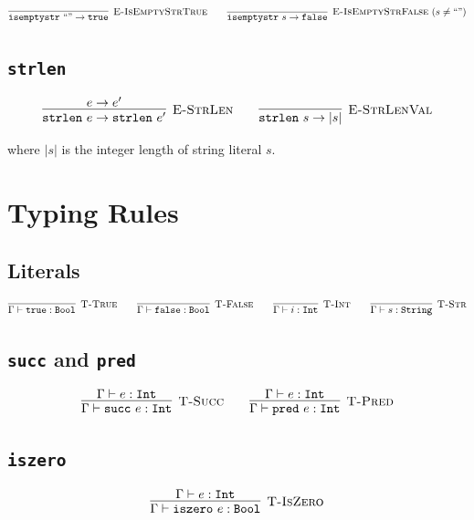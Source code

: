 \documentclass[11pt]{article}
\begin{document}
\[
\infer[\textsc{E-IsEmptyStrTrue}]
  {\texttt{isemptystr}\ \text{``''} \to \texttt{true}}
  {}
\qquad
\infer[\textsc{E-IsEmptyStrFalse}\ (s \neq \text{``''})]
  {\texttt{isemptystr}\ s \to \texttt{false}}
  {}
\]

\subsection*{\texttt{strlen}}

\[
\infer[\textsc{E-StrLen}]
  {\texttt{strlen}\ e \to \texttt{strlen}\ e'}
  {e \to e'}
\qquad
\infer[\textsc{E-StrLenVal}]
  {\texttt{strlen}\ s \to |s|}
  {}
\]

\noindent where $|s|$ is the integer length of string literal $s$.

\section{Typing Rules}

\subsection*{Literals}

\[
\infer[\textsc{T-True}]
  {\Gamma \vdash \texttt{true} : \texttt{Bool}}
  {}
\qquad
\infer[\textsc{T-False}]
  {\Gamma \vdash \texttt{false} : \texttt{Bool}}
  {}
\qquad
\infer[\textsc{T-Int}]
  {\Gamma \vdash i : \texttt{Int}}
  {}
\qquad
\infer[\textsc{T-Str}]
  {\Gamma \vdash s : \texttt{String}}
  {}
\]

\subsection*{\texttt{succ} and \texttt{pred}}

\[
\infer[\textsc{T-Succ}]
  {\Gamma \vdash \texttt{succ}\ e : \texttt{Int}}
  {\Gamma \vdash e : \texttt{Int}}
\qquad
\infer[\textsc{T-Pred}]
  {\Gamma \vdash \texttt{pred}\ e : \texttt{Int}}
  {\Gamma \vdash e : \texttt{Int}}
\]

\subsection*{\texttt{iszero}}

\[
\infer[\textsc{T-IsZero}]
  {\Gamma \vdash \texttt{iszero}\ e : \texttt{Bool}}
  {\Gamma \vdash e : \texttt{Int}}
\]
\end{document}
